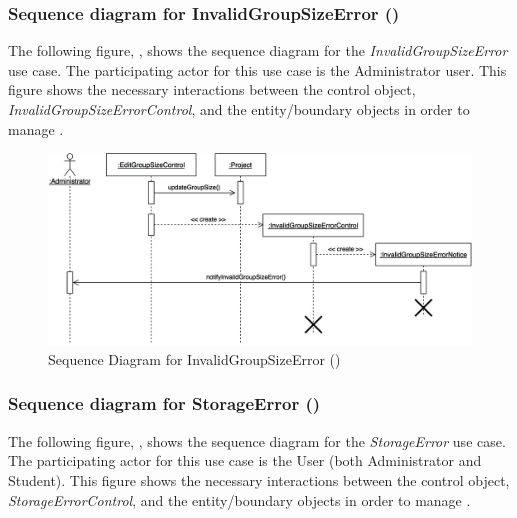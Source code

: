 \documentclass[12pt,letterpaper]{article}
\begin{document}
\subsubsection*{Sequence diagram for InvalidGroupSizeError ()}

The following figure, , shows the sequence diagram for the {\it InvalidGroupSizeError} use case. The participating actor for this use case is
the Administrator user. This figure shows the necessary interactions between the control object, {\it InvalidGroupSizeErrorControl}, and the
entity/boundary objects in order to manage .

\begin{figure}[H]
	\centering{}
	\includegraphics[scale=0.27]{imgs/seq/invalid-group-size-error.png}
	\caption[ - Sequence Diagram for InvalidGroupSizeError]{Sequence Diagram for InvalidGroupSizeError ()}
\end{figure}

\subsubsection*{Sequence diagram for StorageError ()}

The following figure, , shows the sequence diagram for the {\it StorageError} use case. The participating actor for this use case is
the User (both Administrator and Student). This figure shows the necessary interactions between the control object, {\it StorageErrorControl}, and the
entity/boundary objects in order to manage .
\end{document}
